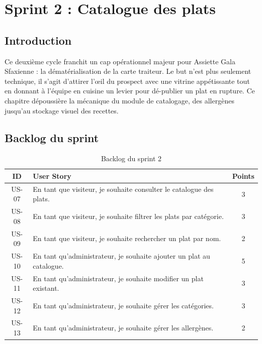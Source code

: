 \chapter{Sprint 2 : Catalogue des plats}

\section{Introduction}

Ce deuxième cycle franchit un cap opérationnel majeur pour Assiette Gala Sfaxienne : la dématérialisation de la carte traiteur. Le but n'est plus seulement technique, il s'agit d'attirer l'œil du prospect avec une vitrine appétissante tout en donnant à l'équipe en cuisine un levier pour dé-publier un plat en rupture. Ce chapitre dépoussière la mécanique du module de catalogage, des allergènes jusqu'au stockage visuel des recettes.

\section{Backlog du sprint}

\begin{table}[H]
    \centering
    \caption{Backlog du sprint 2}
    \label{tab:backlog_sprint2}
    \renewcommand{\arraystretch}{1.3}
    \begin{tabular}{|c|p{8cm}|c|}
        \hline
        \textbf{ID} & \textbf{User Story} & \textbf{Points} \\
        \hline
        US-07 & En tant que visiteur, je souhaite consulter le catalogue des plats. & 3 \\
        \hline
        US-08 & En tant que visiteur, je souhaite filtrer les plats par catégorie. & 3 \\
        \hline
        US-09 & En tant que visiteur, je souhaite rechercher un plat par nom. & 2 \\
        \hline
        US-10 & En tant qu'administrateur, je souhaite ajouter un plat au catalogue. & 5 \\
        \hline
        US-11 & En tant qu'administrateur, je souhaite modifier un plat existant. & 3 \\
        \hline
        US-12 & En tant qu'administrateur, je souhaite gérer les catégories. & 3 \\
        \hline
        US-13 & En tant qu'administrateur, je souhaite gérer les allergènes. & 2 \\
        \hline
    \end{tabular}
\end{table}

